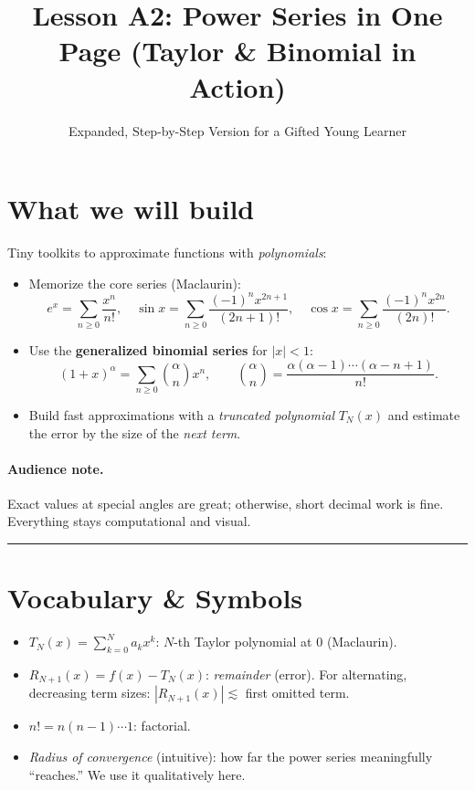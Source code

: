 \documentclass[11pt]{article}
\title{Lesson A2: Power Series in One Page (Taylor \& Binomial in Action)}
\author{Expanded, Step-by-Step Version for a Gifted Young Learner}
\date{}
\begin{document}
\maketitle

\section*{What we will build}
Tiny toolkits to approximate functions with \emph{polynomials}:
\begin{itemize}
  \item Memorize the core series (Maclaurin):
  \[
  e^x=\sum_{n\ge0}\frac{x^n}{n!},\quad
  \sin x=\sum_{n\ge0}\frac{(-1)^n x^{2n+1}}{(2n+1)!},\quad
  \cos x=\sum_{n\ge0}\frac{(-1)^n x^{2n}}{(2n)!}.
  \]
  \item Use the \textbf{generalized binomial series} for \(|x|<1\):
  \[
  (1+x)^{\alpha}=\sum_{n\ge0}\binom{\alpha}{n}x^n,\qquad
  \binom{\alpha}{n}=\frac{\alpha(\alpha-1)\cdots(\alpha-n+1)}{n!}.
  \]
  \item Build fast approximations with a \emph{truncated polynomial} \(T_N(x)\) and estimate the error by the size of the \emph{next term}.
\end{itemize}

\paragraph{Audience note.} Exact values at special angles are great; otherwise, short decimal work is fine. Everything stays computational and visual.

\bigskip\hrule\bigskip

\section*{Vocabulary \& Symbols}
\begin{itemize}
  \item \(\displaystyle T_N(x)=\sum_{k=0}^N a_k x^k\): \(N\)-th Taylor polynomial at \(0\) (Maclaurin).
  \item \(\displaystyle R_{N+1}(x)=f(x)-T_N(x)\): \emph{remainder} (error). For alternating, decreasing term sizes: \(|R_{N+1}(x)|\lesssim\) first omitted term.
  \item \(\displaystyle n! = n(n-1)\cdots 1\): factorial.
  \item \emph{Radius of convergence} (intuitive): how far the power series meaningfully “reaches.” We use it qualitatively here.
\end{itemize}
\end{document}
